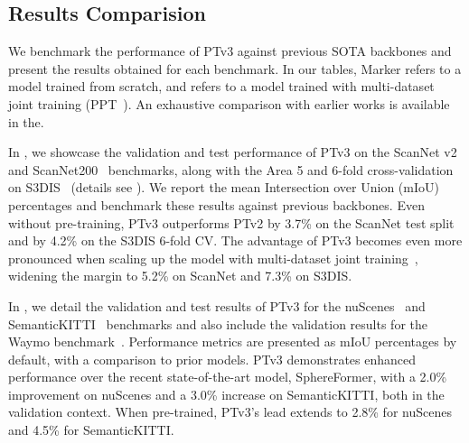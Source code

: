 \begin{table}[t]
    \begin{minipage}{0.48\textwidth}
    \centering
        
        \vspace{-3mm}
        \caption{\textbf{Waymo object detection.} The colume with head name ``\#'' denotes the number of input frames.}\label{tab:outdoor_obj_det}
        \vspace{-4mm}
    \end{minipage}
\end{table}

\subsection{Results Comparision}
\label{sec:results}

We benchmark the performance of PTv3 against previous SOTA backbones and present the results obtained for each benchmark. In our tables, Marker \scratch refers to a model trained from scratch, and \pretrain refers to a model trained with multi-dataset joint training (PPT~\cite{wu2023ppt}). An exhaustive comparison with earlier works is available in the.

In , we showcase the validation and test performance of PTv3 on the ScanNet v2~\cite{dai2017scannet} and ScanNet200~\cite{rozenberszki2022language} benchmarks, along with the Area 5 and 6-fold cross-validation~\cite{qi2017pointnet} on S3DIS~\cite{armeni2016s3dis} (details see ). We report the mean Intersection over Union (mIoU) percentages and benchmark these results against previous backbones. Even without pre-training, PTv3 outperforms PTv2 by 3.7\% on the ScanNet test split and by 4.2\% on the S3DIS 6-fold CV. The advantage of PTv3 becomes even more pronounced when scaling up the model with multi-dataset joint training~\cite{wu2023ppt}, widening the margin to 5.2\% on ScanNet and 7.3\% on S3DIS.

In , we detail the validation and test results of PTv3 for the nuScenes~\cite{caesar2020nuscenes, fong2022panoptic} and SemanticKITTI~\cite{behley2019semantickitti} benchmarks and also include the validation results for the Waymo benchmark~\cite{sun2020waymo}. Performance metrics are presented as mIoU percentages by default, with a comparison to prior models. PTv3 demonstrates enhanced performance over the recent state-of-the-art model, SphereFormer, with a 2.0\% improvement on nuScenes and a 3.0\% increase on SemanticKITTI, both in the validation context. When pre-trained, PTv3's lead extends to 2.8\% for nuScenes and 4.5\% for SemanticKITTI.

